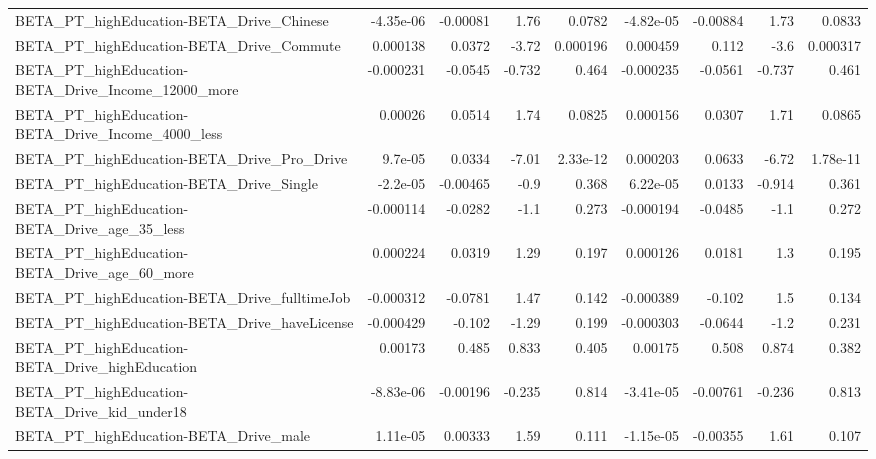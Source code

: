 \begin{tabular}{lrrrrrrrr}
BETA\_PT\_highEducation-BETA\_Drive\_Chinese           &   -4.35e-06 &     -0.00081 &      1.76 &   0.0782 &  -4.82e-05 &    -0.00884 &         1.73 &        0.0833 \\
BETA\_PT\_highEducation-BETA\_Drive\_Commute           &    0.000138 &       0.0372 &     -3.72 & 0.000196 &   0.000459 &       0.112 &         -3.6 &      0.000317 \\
BETA\_PT\_highEducation-BETA\_Drive\_Income\_12000\_more &   -0.000231 &      -0.0545 &    -0.732 &    0.464 &  -0.000235 &     -0.0561 &       -0.737 &         0.461 \\
BETA\_PT\_highEducation-BETA\_Drive\_Income\_4000\_less  &     0.00026 &       0.0514 &      1.74 &   0.0825 &   0.000156 &      0.0307 &         1.71 &        0.0865 \\
BETA\_PT\_highEducation-BETA\_Drive\_Pro\_Drive         &     9.7e-05 &       0.0334 &     -7.01 & 2.33e-12 &   0.000203 &      0.0633 &        -6.72 &      1.78e-11 \\
BETA\_PT\_highEducation-BETA\_Drive\_Single            &    -2.2e-05 &     -0.00465 &      -0.9 &    0.368 &   6.22e-05 &      0.0133 &       -0.914 &         0.361 \\
BETA\_PT\_highEducation-BETA\_Drive\_age\_35\_less       &   -0.000114 &      -0.0282 &      -1.1 &    0.273 &  -0.000194 &     -0.0485 &         -1.1 &         0.272 \\
BETA\_PT\_highEducation-BETA\_Drive\_age\_60\_more       &    0.000224 &       0.0319 &      1.29 &    0.197 &   0.000126 &      0.0181 &          1.3 &         0.195 \\
BETA\_PT\_highEducation-BETA\_Drive\_fulltimeJob       &   -0.000312 &      -0.0781 &      1.47 &    0.142 &  -0.000389 &      -0.102 &          1.5 &         0.134 \\
BETA\_PT\_highEducation-BETA\_Drive\_haveLicense       &   -0.000429 &       -0.102 &     -1.29 &    0.199 &  -0.000303 &     -0.0644 &         -1.2 &         0.231 \\
BETA\_PT\_highEducation-BETA\_Drive\_highEducation     &     0.00173 &        0.485 &     0.833 &    0.405 &    0.00175 &       0.508 &        0.874 &         0.382 \\
BETA\_PT\_highEducation-BETA\_Drive\_kid\_under18       &   -8.83e-06 &     -0.00196 &    -0.235 &    0.814 &  -3.41e-05 &    -0.00761 &       -0.236 &         0.813 \\
BETA\_PT\_highEducation-BETA\_Drive\_male              &    1.11e-05 &      0.00333 &      1.59 &    0.111 &  -1.15e-05 &    -0.00355 &         1.61 &         0.107 \\

\end{tabular}
